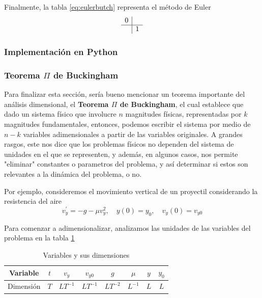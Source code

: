  Finalmente, la tabla \eqref{eq:eulerbutch} representa el método de Euler 
\begin{equation} \label{eq:eulerbutch}
  \begin{array}{c|c }
    0 &  \\
    \hline
    & 1
  \end{array} 
 \end{equation}

\subsubsection{Implementación en Python}



\subsubsection{Teorema $\Pi$ de Buckingham}

Para finalizar esta sección, sería bueno mencionar un teorema importante del análisis dimensional, el \textbf{Teorema $\Pi$ de Buckingham}, el cual establece que dado un sistema físico que involucre $n$ magnitudes físicas, representadas por $k$ magnitudes fundamentales, entonces, podemos escribir el sistema por medio de $n-k$ variables adimensionales a partir de las variables originales. 
A grandes rasgos, este nos dice que los problemas físicos no dependen del sistema de unidades en el que se representen, y además, en algunos casos, nos permite "eliminar" constantes o parametros del problema, y así determinar si estos son relevantes a la dinámica del problema, o no.

Por ejemplo, consideremos el movimiento vertical de un proyectil considerando la resistencia del aire
\begin{equation} \label{eq:dimsi}
  v_{y}^{\prime} = -g - \mu v_{y}^{2}, \quad y(0) = y_{0}, \quad v_{y}(0) = v_{y0}
 \end{equation}

 Para comenzar a adimensionalizar, analizamos las unidades de las variables del problema en la tabla \ref{tab:units}

\begin{table}
  \centering
  \caption{Variables y sus dimensiones}
  \begin{tabular}{|c|c|c|c|c|c|c|c|}
    \hline
    Variable & $t$ & $v_{y}$ & $v_{y0}$ & $g$ & $\mu$ & $y$ & $y_{0}$ \\
    \hline
    Dimensión & $T$ & $LT^{-1}$ & $LT^{-1}$ & $LT^{-2}$ & $L^{-1}$ & $L$ & $L$ \\
    \hline
  \end{tabular}
  \label{tab:units}
\end{table}

